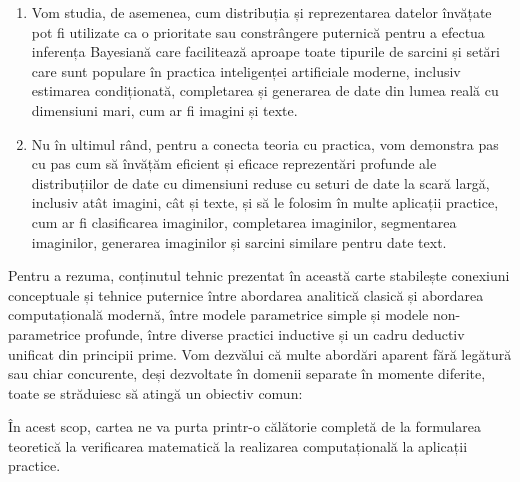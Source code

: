 \documentclass[../../book-main_ro.tex]{subfiles}
\begin{document}
\begin{enumerate}
\item Vom studia, de asemenea, cum distribuția și reprezentarea datelor învățate pot fi utilizate ca o prioritate sau constrângere puternică pentru a efectua inferența Bayesiană care facilitează aproape toate tipurile de sarcini și setări care sunt populare în practica inteligenței artificiale moderne, inclusiv estimarea condiționată, completarea și generarea de date din lumea reală cu dimensiuni mari, cum ar fi imagini și texte.

\item Nu în ultimul rând, pentru a conecta teoria cu practica, vom demonstra pas cu pas cum să învățăm eficient și eficace reprezentări profunde ale distribuțiilor de date cu dimensiuni reduse cu seturi de date la scară largă, inclusiv atât imagini, cât și texte, și să le folosim în multe aplicații practice, cum ar fi clasificarea imaginilor, completarea imaginilor, segmentarea imaginilor, generarea imaginilor și sarcini similare pentru date text.
\end{enumerate}

Pentru a rezuma, conținutul tehnic prezentat în această carte stabilește conexiuni conceptuale și tehnice puternice între abordarea analitică clasică și abordarea computațională modernă, între modele parametrice simple și modele non-parametrice profunde, între diverse practici inductive și un cadru deductiv unificat din principii prime. Vom dezvălui că multe abordări aparent fără legătură sau chiar concurente, deși dezvoltate în domenii separate în momente diferite, toate se străduiesc să atingă un obiectiv comun:
\begin{quote}
\end{quote}
În acest scop, cartea ne va purta printr-o călătorie completă de la formularea teoretică la verificarea matematică la realizarea computațională la aplicații practice.
\end{document}
